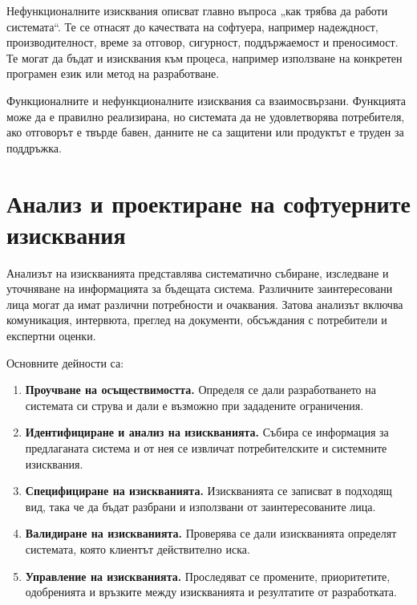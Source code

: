 Нефункционалните изисквания описват главно въпроса „как трябва да работи системата“. Те се отнасят до качествата на софтуера, например надеждност, производителност, време за отговор, сигурност, поддържаемост и преносимост. Те могат да бъдат и изисквания към процеса, например използване на конкретен програмен език или метод на разработване.

Функционалните и нефункционалните изисквания са взаимосвързани. Функцията може да е правилно реализирана, но системата да не удовлетворява потребителя, ако отговорът е твърде бавен, данните не са защитени или продуктът е труден за поддръжка.

\section{Анализ и проектиране на софтуерните изисквания}\label{s:26.6}

\begin{defn}
Анализът на изискванията представлява систематично събиране, изследване и уточняване на информацията за бъдещата система. Различните заинтересовани лица могат да имат различни потребности и очаквания. Затова анализът включва комуникация, интервюта, преглед на документи, обсъждания с потребители и експертни оценки.
\end{defn}

Основните дейности са:

\begin{enumerate}
    \item \textbf{Проучване на осъществимостта.} Определя се дали разработването на системата си струва и дали е възможно при зададените ограничения.
    \item \textbf{Идентифициране и анализ на изискванията.} Събира се информация за предлаганата система и от нея се извличат потребителските и системните изисквания.
    \item \textbf{Специфициране на изискванията.} Изискванията се записват в подходящ вид, така че да бъдат разбрани и използвани от заинтересованите лица.
    \item \textbf{Валидиране на изискванията.} Проверява се дали изискванията определят системата, която клиентът действително иска.
    \item \textbf{Управление на изискванията.} Проследяват се промените, приоритетите, одобренията и връзките между изискванията и резултатите от разработката.
\end{enumerate}

